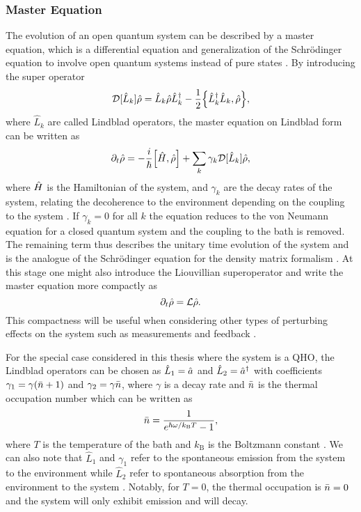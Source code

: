 \subsubsection{Master Equation}\label{sec:mastereq}
The evolution of an open quantum system can be described by a master equation, which is a differential equation and generalization of the Schrödinger equation to involve open quantum systems instead of pure states \cite{Annby-Andersson:2024}. By introducing the super operator
\begin{equation}
    \super{\hat{L}_k}\dmatrix = \hat{L}_k\dmatrix\hat{L}_k^{\dagger} - \frac{1}{2} \acomm{\hat{L}_k^\dagger \hat{L}_k}{\dmatrix},
\end{equation} 
where $\hat{L}_k$ are called Lindblad operators, the master equation on Lindblad form can be written as 
\begin{equation}
    \dt\dmatrix = -\frac{i}{\hbar}\comm{\hamiltonian}{\dmatrix} + \sum_k \gamma_k\super{\hat{L}_k}\dmatrix,
\end{equation}
where $\hat{H}$ is the Hamiltonian of the system, and $\gamma_k$ are the decay rates of the system, relating the decoherence to the environment depending on the coupling to the system \cite{Annby-Andersson:2024}. If $\gamma_k = 0$ for all $k$ the equation reduces to the von Neumann equation for a closed quantum system and the coupling to the bath is removed. The remaining term thus describes the unitary time evolution of the system and is the analogue of the Schrödinger equation for the density matrix formalism \cite{Annby-Andersson:2024}. At this stage one might also introduce the Liouvillian superoperator and write the master equation more compactly as
\begin{equation}
    \partial_t\hat{\rho} = \mathcal{L}\hat{\rho}.
\end{equation}
This compactness will be useful when considering other types of perturbing effects on the system such as measurements and feedback \cite{Annby-Andersson:2024}.

For the special case considered in this thesis where the system is a QHO, the Lindblad operators can be chosen as $\hat{L}_1 = \hat{a}$ and $\hat{L}_2 = \hat{a}^{\dagger}$ with coefficients $\gamma_1 = \gamma(\bar{n} + 1)$ and $\gamma_2 = \gamma \bar{n}$, where $\gamma$ is a decay rate and $\bar{n}$ is the thermal occupation number which can be written as 
\begin{equation}
    \bar{n} = \frac{1}{e^{\hbar\omega/ k_\mathrm{B}T} - 1},
\end{equation}
where $T$ is the temperature of the bath and $k_\mathrm{B}$ is the Boltzmann constant \cite{Meystre:2021}. We can also note that $\hat{L}_1$ and $\gamma_1$ refer to the spontaneous emission from the system to the environment while $\hat{L}_2$ refer to spontaneous absorption from the environment to the system \cite{Meystre:2021}. Notably, for $T=0$, the thermal occupation is $\bar{n} = 0$ and the system will only exhibit emission and will decay.


